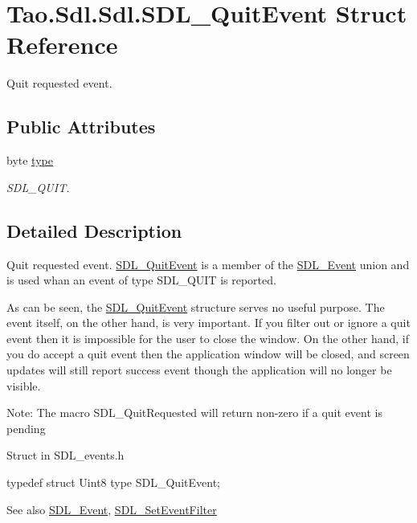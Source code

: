 \hypertarget{struct_tao_1_1_sdl_1_1_sdl_1_1_s_d_l___quit_event}{
\section{Tao.Sdl.Sdl.SDL\_\-QuitEvent Struct Reference}
\label{struct_tao_1_1_sdl_1_1_sdl_1_1_s_d_l___quit_event}
}


Quit requested event.  


\subsection*{Public Attributes}
\begin{DoxyCompactItemize}
\item 
byte \hyperlink{struct_tao_1_1_sdl_1_1_sdl_1_1_s_d_l___quit_event_a000e04d4783f821917569ef4942128fa}{type}
\begin{DoxyCompactList}\small\item\em SDL\_\-QUIT. \item\end{DoxyCompactList}\end{DoxyCompactItemize}


\subsection{Detailed Description}
Quit requested event. \hyperlink{struct_tao_1_1_sdl_1_1_sdl_1_1_s_d_l___quit_event}{SDL\_\-QuitEvent} is a member of the \hyperlink{struct_tao_1_1_sdl_1_1_s_d_l___event}{SDL\_\-Event} union and is used whan an event of type SDL\_\-QUIT is reported. 

As can be seen, the \hyperlink{struct_tao_1_1_sdl_1_1_sdl_1_1_s_d_l___quit_event}{SDL\_\-QuitEvent} structure serves no useful purpose. The event itself, on the other hand, is very important. If you filter out or ignore a quit event then it is impossible for the user to close the window. On the other hand, if you do accept a quit event then the application window will be closed, and screen updates will still report success event though the application will no longer be visible. 

Note: The macro SDL\_\-QuitRequested will return non-\/zero if a quit event is pending 

Struct in SDL\_\-events.h 
\begin{DoxyCode}
            typedef struct{
                        Uint8 type
                        } SDL_QuitEvent;
\end{DoxyCode}
 \begin{DoxySeeAlso}{See also}
\hyperlink{struct_tao_1_1_sdl_1_1_s_d_l___event}{SDL\_\-Event}, \hyperlink{_sdl_8cs_afd1ab8f1891d71ad6544323050271d2d}{SDL\_\-SetEventFilter}


\end{DoxySeeAlso}


